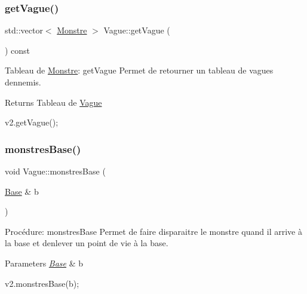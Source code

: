 \subsubsection{\texorpdfstring{get\+Vague()}{getVague()}}
{\footnotesize\ttfamily std\+::vector$<$ \hyperlink{classMonstre}{Monstre} $>$ Vague\+::get\+Vague (\begin{DoxyParamCaption}{ }\end{DoxyParamCaption}) const}



Tableau de \hyperlink{classMonstre}{Monstre}\+: get\+Vague Permet de retourner un tableau de vagues d\textquotesingle{}ennemis. 

\begin{DoxyReturn}{Returns}
Tableau de \hyperlink{classVague}{Vague} 
\begin{DoxyCode}
v2.getVague();
\end{DoxyCode}
 
\end{DoxyReturn}
\mbox{\label{classVague_ad9d543a1eafc579d8a4de88d278a53a7}} 
\subsubsection{\texorpdfstring{monstres\+Base()}{monstresBase()}}
{\footnotesize\ttfamily void Vague\+::monstres\+Base (\begin{DoxyParamCaption}\item[{\hyperlink{classBase}{Base} \&}]{b }\end{DoxyParamCaption})}



Procédure\+: monstres\+Base Permet de faire disparaitre le monstre quand il arrive à la base et d\textquotesingle{}enlever un point de vie à la base. 


\begin{DoxyParams}{Parameters}
{\em \hyperlink{classBase}{Base}} & b 
\begin{DoxyCode}
v2.monstresBase(b);
\end{DoxyCode}
 \\
\hline
\end{DoxyParams}
\mbox{\label{classVague_ae9e45cad0c4a4da804f749e03952545c}} 
